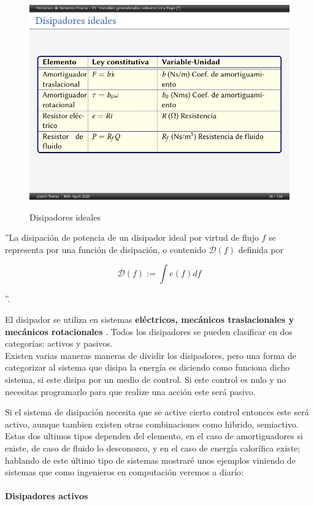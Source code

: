\begin{figure}[H]
	\centering
	\caption{Disipadores ideales \cite{w1}}
	\includegraphics[width=0.7\linewidth]{latex/tabla3}
	\label{fig:tabla3}
\end{figure}

''La disipación de potencia de un disipador ideal por virtud de flujo $ f  $ se
representa por una función de disipación, o contenido $ \mathcal{D}(f) $ definida por

\begin{equation*}
	\mathcal{D}(f):=\int e(f) d f
\end{equation*}	

''\cite{w1}.

El disipador se utiliza en sistemas \textbf{eléctricos, mecánicos traslacionales y mecánicos rotacionales}	. Todos los disipadores se pueden clasificar en dos categorías: activos y pasivos.\\



Existen varias maneras maneras de dividir los disipadores, pero una forma de categorizar al sistema que disipa la energía es diciendo como funciona dicho sistema, si este disipa por un medio de control. Si este control es nulo y no necesitas programarlo para que realize una acción este será pasivo.

Si el sistema de disipación necesita que se active cierto control entonces este será activo, aunque tambien existen otras combinaciones como hibrido, semiactivo. Estas dos ultimos tipos dependen del elemento, en el caso de amortiguadores si existe, de caso de fluido lo desconozco, y en el caso de energía calorífica existe; hablando de este último tipo de sistemas mostraré unos ejemplos viniendo de sistemas que como ingenieros en computación veremos a diarío:

\paragraph{Disipadores activos}

